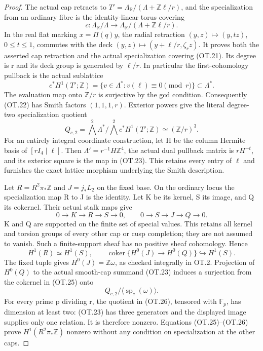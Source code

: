 \begin{proof}
The actual cap retracts to
\(T'=\Lambda_{\mathbb R}/(\Lambda+\mathbb Z\ell/r)\), and the specialization from an ordinary
fibre is the identity-linear torus covering
\[
 c:\Lambda_{\mathbb R}/\Lambda\longrightarrow
       \Lambda_{\mathbb R}/(\Lambda+\mathbb Z\ell/r).
                                                               \tag{OT.21}
\]
In the real flat marking \(x=\Pi(q)y\), the radial retraction
\((y,z)\mapsto(y,tz)\), \(0\le t\le1\), commutes with the deck
\((y,z)\mapsto(y+\ell/r,\zeta_rz)\). It proves both the asserted cap retraction
and the actual specialization covering (OT.21). Its degree is r and
its deck group is generated by \(\ell/r\). In particular
the first-cohomology pullback is the actual sublattice
\[
 c^*H^1(T';\mathbb Z)
 =\{v\in\Lambda^*:v(\ell)\equiv0\pmod r\}
                 \subset\Lambda^*.                         \tag{OT.22}
\]
The evaluation map onto \(\mathbb Z/r\) is surjective by the gcd condition.
Consequently (OT.22) has Smith factors \((1,1,1,r)\). Exterior powers give
the literal degree-two specialization quotient
\[
 Q_{c,2}=\bigwedge^2\Lambda^*/
                 \bigwedge^2c^*H^1(T';\mathbb Z)
                      \simeq(\mathbb Z/r)^3.              \tag{OT.23}
\]
For an entirely integral coordinate construction, let H be the column
Hermite basis of \([rI_4\mid\ell]\). Then \(\Lambda'=r^{-1}H\mathbb Z^4\), the actual
dual pullback matrix is \(rH^{-t}\), and its exterior square is the map
in (OT.23). This retains every entry of \(\ell\) and furnishes the exact
lattice morphism underlying the Smith description.

Let \(R=R^2\pi_*\mathbb Z\) and \(J=j_*L_2\) on the fixed base. On the ordinary locus
the specialization map R to J is the identity. Let K be its kernel,
S its image, and Q its cokernel. Their actual stalk maps give
\[
 0\longrightarrow K\longrightarrow R\longrightarrow S
       \longrightarrow0,\qquad
 0\longrightarrow S\longrightarrow J\longrightarrow Q
       \longrightarrow0.                                \tag{OT.24}
\]
K and Q are supported on the finite set of special values. This retains
all kernel and torsion groups of every other cap or cusp completion;
they are not assumed to vanish. Such a finite-support sheaf has no
positive sheaf cohomology. Hence
\[
 H^1(R)\simeq H^1(S),\qquad
 \operatorname{coker}\{H^0(J)\longrightarrow H^0(Q)\}
                         \hookrightarrow H^1(S).         \tag{OT.25}
\]
The fixed tuple gives \(H^0(J)=\mathbb Z\omega\), as checked integrally in OT.2.
Projection of \(H^0(Q)\) to the actual smooth-cap summand (OT.23) induces
a surjection from the cokernel in (OT.25) onto
\[
                  Q_{c,2}/\langle\operatorname{sp}_c(\omega)\rangle.
                                                               \tag{OT.26}
\]
For every prime p dividing r, the quotient in (OT.26), tensored with
\(\mathbb F_p\), has dimension at least two: (OT.23) has three generators and the
displayed image supplies only one relation. It is therefore nonzero.
Equations (OT.25)--(OT.26) prove \(H^1(R^2\pi_*\mathbb Z)\) nonzero without any
condition on specialization at the other caps.


\end{proof}
